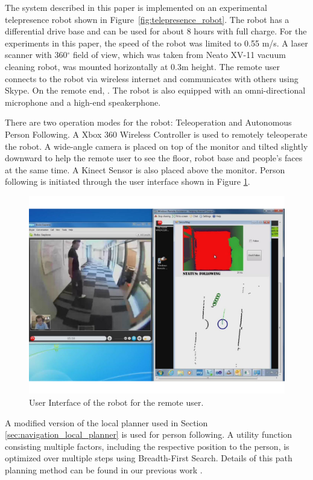 The system described in this paper is implemented on an experimental telepresence robot shown in Figure~\ref{fig:telepresence_robot}. The robot has a differential drive base and can be used for about 8 hours with full charge. For the experiments in this paper, the speed of the robot was limited to 0.55 m/s. A laser scanner with 360$^{\circ}$ field of view, which was taken from Neato XV-11 vacuum cleaning robot, was mounted horizontally at 0.3m height. The remote user connects to the robot via wireless internet and communicates with others using Skype. On the remote end, . The robot is also equipped with an omni-directional microphone and a high-end speakerphone.

There are two operation modes for the robot: Teleoperation and Autonomous Person Following. A Xbox 360 Wireless Controller is used to remotely teleoperate the robot.  A wide-angle camera is placed on top of the monitor and tilted slightly downward to help the remote user to see the floor, robot base and people's faces at the same time. A Kinect Sensor is also placed above the monitor. Person following is initiated through the user interface shown in Figure \ref{fig:telepresence_ui}.

\begin{figure}[h!]
\centering
\includegraphics[width=1.0\textwidth]{pics/telepresence_ui_cropped}
\caption{User Interface of the robot for the remote user.}
\label{fig:telepresence_ui}
\end{figure}

A modified version of the local planner used in Section \ref{sec:navigation_local_planner} is used for person following. A utility function consisting multiple factors, including the respective position to the person, is optimized over multiple steps using Breadth-First Search. Details of this path planning method can be found in our previous work \cite{cosgun2013autonomous}.


